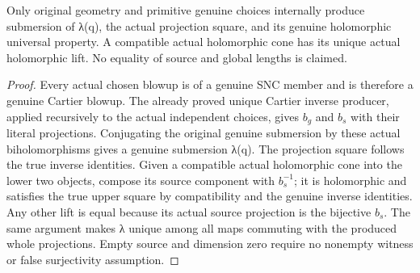 \begin{lemma}
\label{hir:submersion-choice-image-trace-actual-universal}
\leanok
{}

Only original geometry and primitive genuine choices internally produce submersion of λ(q), the actual projection square, and its genuine holomorphic universal property. A compatible actual holomorphic cone has its unique actual holomorphic lift. No equality of source and global lengths is claimed.
\end{lemma}
\begin{proof}
Every actual chosen blowup is of a genuine SNC member and is therefore a genuine Cartier blowup. The already proved unique Cartier inverse producer, applied recursively to the actual independent choices, gives $b_g$ and $b_s$ with their literal projections. Conjugating the original genuine submersion by these actual biholomorphisms gives a genuine submersion λ(q). The projection square follows the true inverse identities. Given a compatible actual holomorphic cone into the lower two objects, compose its source component with $b_s^{-1}$; it is holomorphic and satisfies the true upper square by compatibility and the genuine inverse identities. Any other lift is equal because its actual source projection is the bijective $b_s$. The same argument makes λ unique among all maps commuting with the produced whole projections. Empty source and dimension zero require no nonempty witness or false surjectivity assumption.
\end{proof}

